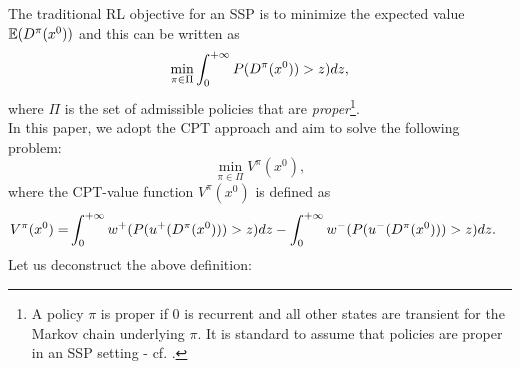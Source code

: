 \documentclass[11pt,letterpaper,english]{article}
\begin{document}
The traditional RL objective for an SSP is to minimize the expected value $\mathbb{E} (D^\pi(x^0))$ and this can be written as
$$\min_{\pi\in\Pi} \int_0^{+\infty} P(D^\pi(x^0))>z) dz,$$ where $\Pi$ is the set of admissible policies that are \textit{proper}\footnote{A policy $\pi$ is proper if $0$ is recurrent and all other states are transient for the Markov chain underlying $\pi$. It is standard to assume that policies are proper in an SSP setting - cf. \cite{bertsekas1995dynamic}.}.\\
In this paper, we adopt the CPT approach and aim to solve the following problem: 
$$ \min_{\pi \in \Pi} V^\pi(x^0),$$
where the CPT-value function $V^\pi(x^0)$ is defined as
\begin{align}
V^\pi(x^0) = &\int_0^{+\infty} w^+(P(u^+(D^\pi(x^0)))>z) dz - \int_0^{+\infty} w^-(P(u^-(D^\pi(x^0)))>z) dz. \label{eq:cpt-mdp}
\end{align}
Let us deconstruct the above definition:
\end{document}
